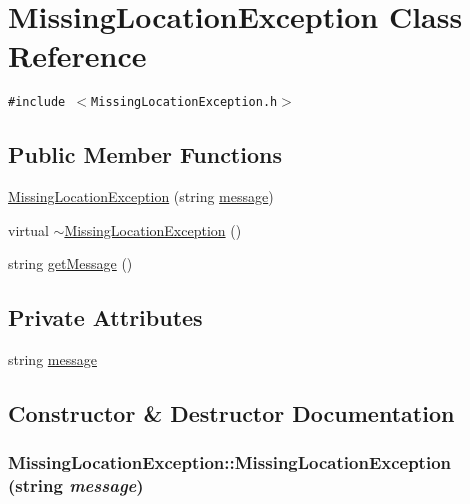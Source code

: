 \hypertarget{class_missing_location_exception}{
\section{Missing\-Location\-Exception Class Reference}
\label{class_missing_location_exception}
}
{\tt \#include $<$Missing\-Location\-Exception.h$>$}

\subsection*{Public Member Functions}
\begin{CompactItemize}
\item 
\hyperlink{class_missing_location_exception_d7af861342f2e17d18a08d302187db8b}{Missing\-Location\-Exception} (string \hyperlink{class_missing_location_exception_78e731027d8fd50ed642340b7c9a63b3}{message})
\item 
virtual \hyperlink{class_missing_location_exception_94b992eb7227b7923acd746a7d4b5f86}{$\sim$Missing\-Location\-Exception} ()
\item 
string \hyperlink{class_missing_location_exception_d3115ba6a009eec3cfb9fdc7af4c7fdb}{get\-Message} ()
\end{CompactItemize}
\subsection*{Private Attributes}
\begin{CompactItemize}
\item 
string \hyperlink{class_missing_location_exception_78e731027d8fd50ed642340b7c9a63b3}{message}
\end{CompactItemize}


\subsection{Constructor \& Destructor Documentation}
\hypertarget{class_missing_location_exception_d7af861342f2e17d18a08d302187db8b}{
\subsubsection[MissingLocationException]{\setlength{\rightskip}{0pt plus 5cm}Missing\-Location\-Exception::Missing\-Location\-Exception (string {\em message})}}
\label{class_missing_location_exception_d7af861342f2e17d18a08d302187db8b}


